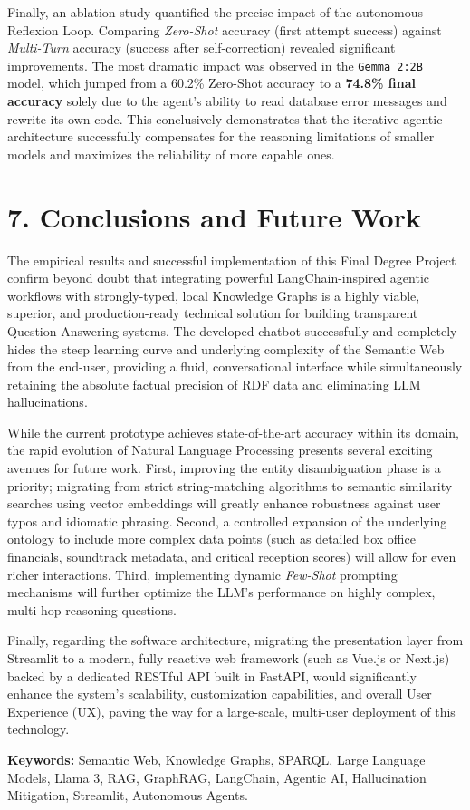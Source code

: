 Finally, an ablation study quantified the precise impact of the autonomous Reflexion Loop. Comparing \textit{Zero-Shot} accuracy (first attempt success) against \textit{Multi-Turn} accuracy (success after self-correction) revealed significant improvements. The most dramatic impact was observed in the \texttt{Gemma 2:2B} model, which jumped from a 60.2\% Zero-Shot accuracy to a \textbf{74.8\% final accuracy} solely due to the agent's ability to read database error messages and rewrite its own code. This conclusively demonstrates that the iterative agentic architecture successfully compensates for the reasoning limitations of smaller models and maximizes the reliability of more capable ones.

\section*{7. Conclusions and Future Work}

The empirical results and successful implementation of this Final Degree Project confirm beyond doubt that integrating powerful LangChain-inspired agentic workflows with strongly-typed, local Knowledge Graphs is a highly viable, superior, and production-ready technical solution for building transparent Question-Answering systems. The developed chatbot successfully and completely hides the steep learning curve and underlying complexity of the Semantic Web from the end-user, providing a fluid, conversational interface while simultaneously retaining the absolute factual precision of RDF data and eliminating LLM hallucinations.

While the current prototype achieves state-of-the-art accuracy within its domain, the rapid evolution of Natural Language Processing presents several exciting avenues for future work. First, improving the entity disambiguation phase is a priority; migrating from strict string-matching algorithms to semantic similarity searches using vector embeddings will greatly enhance robustness against user typos and idiomatic phrasing. Second, a controlled expansion of the underlying ontology to include more complex data points (such as detailed box office financials, soundtrack metadata, and critical reception scores) will allow for even richer interactions. Third, implementing dynamic \textit{Few-Shot} prompting mechanisms will further optimize the LLM's performance on highly complex, multi-hop reasoning questions. 

Finally, regarding the software architecture, migrating the presentation layer from Streamlit to a modern, fully reactive web framework (such as Vue.js or Next.js) backed by a dedicated RESTful API built in FastAPI, would significantly enhance the system's scalability, customization capabilities, and overall User Experience (UX), paving the way for a large-scale, multi-user deployment of this technology.

\vspace{1cm}
\textbf{Keywords:} Semantic Web, Knowledge Graphs, SPARQL, Large Language Models, Llama 3, RAG, GraphRAG, LangChain, Agentic AI, Hallucination Mitigation, Streamlit, Autonomous Agents.

